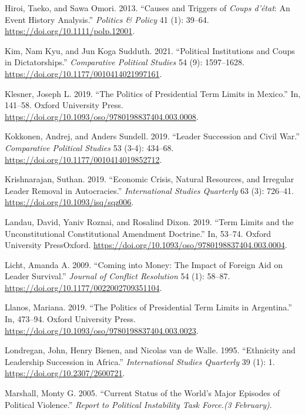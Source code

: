 \documentclass[
  12pt,
]{report}
\newlength{\cslhangindent}
\newenvironment{CSLReferences}[2] %
 {\begin{list}{}{%
  \setlength{\itemindent}{0pt}
  \setlength{\leftmargin}{0pt}
  \setlength{\parsep}{0pt}
  \ifodd #1
   \setlength{\leftmargin}{\cslhangindent}
   \setlength{\itemindent}{-1\cslhangindent}
  \fi
  \setlength{\itemsep}{#2\baselineskip}}}
 {\end{list}}
\begin{document}
\begin{CSLReferences}{1}{0}
Hiroi, Taeko, and Sawa Omori. 2013. {``Causes and Triggers of
{\emph{Coups d'état}}: An Event History Analysis.''} \emph{Politics \&
Policy} 41 (1): 39--64. \url{https://doi.org/10.1111/polp.12001}.

Kim, Nam Kyu, and Jun Koga Sudduth. 2021. {``Political Institutions and
Coups in Dictatorships.''} \emph{Comparative Political Studies} 54 (9):
1597--1628. \url{https://doi.org/10.1177/0010414021997161}.

Klesner, Joseph L. 2019. {``The Politics of Presidential Term Limits in
Mexico.''} In, 141--58. Oxford University Press.
\url{https://doi.org/10.1093/oso/9780198837404.003.0008}.

Kokkonen, Andrej, and Anders Sundell. 2019. {``Leader Succession and
Civil War.''} \emph{Comparative Political Studies} 53 (3-4): 434--68.
\url{https://doi.org/10.1177/0010414019852712}.

Krishnarajan, Suthan. 2019. {``Economic Crisis, Natural Resources, and
Irregular Leader Removal in Autocracies.''} \emph{International Studies
Quarterly} 63 (3): 726--41. \url{https://doi.org/10.1093/isq/sqz006}.

Landau, David, Yaniv Roznai, and Rosalind Dixon. 2019. {``Term Limits
and the Unconstitutional Constitutional Amendment Doctrine.''} In,
53--74. Oxford University PressOxford.
\url{https://doi.org/10.1093/oso/9780198837404.003.0004}.

Licht, Amanda A. 2009. {``Coming into Money: The Impact of Foreign Aid
on Leader Survival.''} \emph{Journal of Conflict Resolution} 54 (1):
58--87. \url{https://doi.org/10.1177/0022002709351104}.

Llanos, Mariana. 2019. {``The Politics of Presidential Term Limits in
Argentina.''} In, 473--94. Oxford University Press.
\url{https://doi.org/10.1093/oso/9780198837404.003.0023}.

Londregan, John, Henry Bienen, and Nicolas van de Walle. 1995.
{``Ethnicity and Leadership Succession in Africa.''} \emph{International
Studies Quarterly} 39 (1): 1. \url{https://doi.org/10.2307/2600721}.

Marshall, Monty G. 2005. {``Current Status of the World's Major Episodes
of Political Violence.''} \emph{Report to Political Instability Task
Force.(3 February)}.


\end{CSLReferences}
\end{document}
